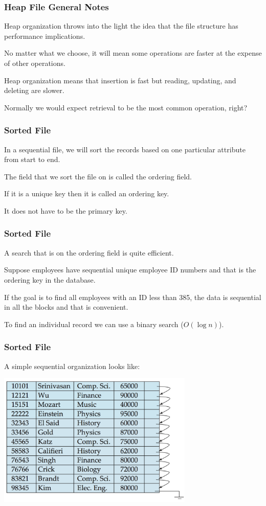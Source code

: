 \begin{frame}
\frametitle{Heap File General Notes}

Heap organization throws into the light the idea that the file structure has performance implications. 

No matter what we choose, it will mean some operations are faster at the expense of other operations. 

Heap organization means that insertion is fast but reading, updating, and deleting are slower. 

Normally we would expect retrieval to be the most common operation, right?


\end{frame}

\begin{frame}
\frametitle{Sorted File}

In a sequential file, we will sort the records based on one particular attribute from start to end.

The field that we sort the file on is called the \alert{ordering field}. 

If it is a  unique key then it is called an \alert{ordering key}.

It does not have to be the primary key.

\end{frame}


\begin{frame}
\frametitle{Sorted File}

A search that is on the ordering field is quite efficient. 

Suppose employees have sequential unique employee ID numbers and that is the ordering key in the database. 

If the goal is to find all employees with an ID less than 385, the data is sequential in all the blocks and that is convenient.

To find an individual record we can use a binary search ($O(\log n)$).

\end{frame}


\begin{frame}
\frametitle{Sorted File}
A simple sequential organization looks like:

\begin{center}
\includegraphics[width=0.7\textwidth]{images/sequential}
\end{center}


\end{frame}



